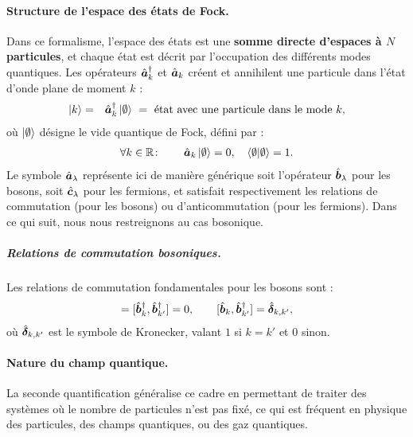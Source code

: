 \paragraph{Structure de l’espace des états de Fock.}
Dans ce formalisme, l’espace des états est une {\bf somme directe d’espaces à $N$ particules}, et chaque état est décrit par l’occupation des différents modes quantiques. Les opérateurs $\hat{\bm{a}}_k^\dagger$ et $\hat{\bm{a}}_k$ créent et annihilent une particule dans l’état d’onde plane de moment $k$ :
\begin{eqnarray*}
	\ket{k} & = & \hat{\bm{a}}_k^\dagger \ket{\emptyset} ~=~ \text{état avec une particule dans le mode } k,	
\end{eqnarray*}
où \(\ket{\emptyset}\) désigne le vide quantique de Fock, défini par :
\begin{eqnarray}
	\forall k \in \mathbb{R}\colon \qquad \hat{\bm{a}}_k \ket{\emptyset} = 0 ,\quad  \langle \emptyset \vert \emptyset \rangle = 1. \label{chap:eq.vide.fock.k}
\end{eqnarray}
Le symbole \( \hat{\bm{a}}_\lambda \) représente ici de manière générique soit l’opérateur \( \hat{\bm{b}}_\lambda \) pour les bosons, soit \( \hat{\bm{c}}_\lambda \) pour les fermions, et satisfait respectivement les relations de commutation (pour les bosons) ou d’anticommutation (pour les fermions). Dans ce qui suit, nous nous restreignons au cas bosonique.

\subparagraph{Relations de commutation bosoniques.} Les relations de commutation fondamentales pour les bosons sont :
\begin{eqnarray}
	[\operator{b}_k, \operator{b}_{k'}] = [\operator{b}_k^\dagger, \operator{b}_{k'}^\dagger] = 0 ,\qquad [\operator{b}_k, \operator{b}_{k'}^\dagger] = \operator{\delta}_{k,k'}, \label{chap:1:com.1.k}
\end{eqnarray}
où $\hat{\bm{\delta}}_{k,k'}$ est le symbole de Kronecker, valant $1$ si $k = k'$ et $0$ sinon.

\paragraph{Nature du champ quantique.}
La seconde quantification généralise ce cadre en permettant de traiter des systèmes où le nombre de particules n’est pas fixé, ce qui est fréquent en physique des particules, des champs quantiques, ou des gaz quantiques.

